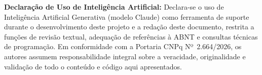 \documentclass[12pt]{article}
\begin{document}
\vspace{1.2em}
\noindent\textbf{Declaração de Uso de Inteligência Artificial:}
Declara-se o uso de Inteligência Artificial Generativa (modelo Claude) como ferramenta
de suporte durante o desenvolvimento deste projeto e a redação deste documento, restrita
a funções de revisão textual, adequação de referências à ABNT e consultas técnicas de
programação. Em conformidade com a Portaria CNPq Nº~2.664/2026, os autores assumem
responsabilidade integral sobre a veracidade, originalidade e validação de todo o
conteúdo e código aqui apresentados.
\end{document}
